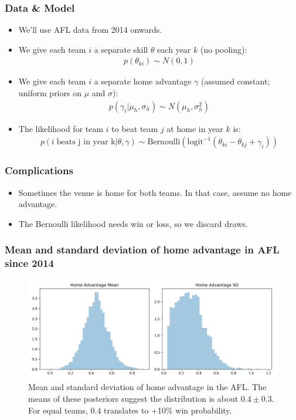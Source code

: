 \documentclass{beamer}
\begin{document}
\begin{frame}
\frametitle{Data \& Model}
\begin{itemize}
	\item We'll use AFL data from 2014 onwards.
	\item We give each team $i$ a separate skill $\theta$ each year $k$ (no pooling):
	\begin{align*}
		p(\theta_{ki}) \sim N(0, 1)
	\end{align*}
	\item We give each team $i$ a separate home advantage $\gamma$ (assumed constant; uniform priors on $\mu$ and $\sigma$):
	\begin{align*}
		p(\gamma_i | \mu_h, \sigma_h) \sim N(\mu_h, \sigma_h^2)
	\end{align*}
	\item The likelihood for team $i$ to beat team $j$ at home in year $k$ is:
	\begin{align*}
		p(\textrm{i beats j in year k}|\theta, \gamma) \sim \textrm{Bernoulli}(\textrm{logit}^{-1}(\theta_{ki} - \theta_{kj} + \gamma_i))
	\end{align*}
\end{itemize}
\end{frame}

\begin{frame}
	\frametitle{Complications}
	\begin{itemize}
		\item Sometimes the venue is home for both teams. In that case, assume no home advantage.
		\item The Bernoulli likelihood needs win or loss, so we discard draws.
	\end{itemize}
\end{frame}

\begin{frame}
\frametitle{Mean and standard deviation of home advantage in AFL since 2014}
\begin{figure}
	\includegraphics[width=\textwidth]{mean_var_home_ad}	
	\caption{Mean and standard deviation of home advantage in the AFL. The means of these posteriors suggest the distribution is about $0.4 \pm 0.3$. For equal teams, $0.4$ translates to +10\% win probability.}
\end{figure}
\end{frame}
\end{document}
